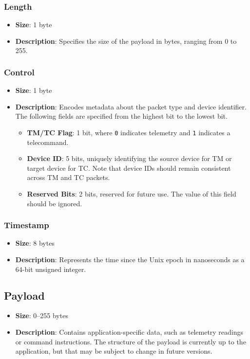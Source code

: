 \documentclass[a4paper,11pt,english]{article}
\begin{document}
\subsubsection{Length}
\begin{itemize}
  \item \textbf{Size}: 1 byte
  \item \textbf{Description}: Specifies the size of the payload in bytes, ranging from 0 to 255.
\end{itemize}

\subsubsection{Control}
\begin{itemize}
  \item \textbf{Size}: 1 byte
  \item \textbf{Description}: Encodes metadata about the packet type and device identifier. The following fields are specified from the highest bit to the lowest bit.
        \begin{itemize}
          \item \textbf{TM/TC Flag}: 1 bit, where \texttt{0} indicates telemetry and \texttt{1} indicates a telecommand.
          \item \textbf{Device ID}: 5 bits, uniquely identifying the source device for TM or target device for TC. Note that device IDs should remain consistent across TM and TC packets.
          \item \textbf{Reserved Bits}: 2 bits, reserved for future use. The value of this field should be ignored.
        \end{itemize}
\end{itemize}

\subsubsection{Timestamp}
\begin{itemize}
  \item \textbf{Size}: 8 bytes
  \item \textbf{Description}: Represents the time since the Unix epoch in nanoseconds as a 64-bit unsigned integer.
\end{itemize}

\subsection{Payload}
\begin{itemize}
  \item \textbf{Size}: 0–255 bytes
  \item \textbf{Description}: Contains application-specific data, such as telemetry readings or command instructions. The structure of the payload is currently up to the application, but that may be subject to change in future versions.
\end{itemize}
\end{document}
